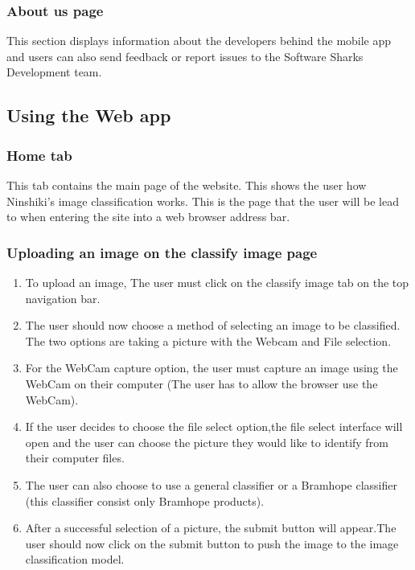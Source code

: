 \documentclass[a4paper, 12pt]{article}
\begin{document}
\subsubsection{About us page}
This section displays information about the developers behind the mobile app and users can also send feedback or report issues to the Software Sharks Development team.

\subsection{Using the Web app}
\subsubsection{Home tab}
This tab contains the main page of the website. This shows the user how Ninshiki's image classification works. This is the page that the user will be lead to when entering the site into a web browser address bar.

\subsubsection{Uploading an image on the classify image page}

\begin{enumerate}
\item To upload an image, The  user must click on the classify image tab on the top navigation bar.
\item The user should now choose a method of selecting an image to be classified. The two options are taking a picture with the Webcam and File selection.
\item For the WebCam capture option, the user must capture an image using the WebCam on their computer (The user has to allow the browser use the WebCam).

\item If the user decides to choose the file select option,the file select interface will open and the user can choose the picture they would like to identify from their computer files. 

\item The user can also choose to use a general classifier or a Bramhope classifier (this classifier consist only Bramhope products). 

\item After a successful selection of a picture, the submit button will appear.The user should now click on the submit button to push the image to the image classification model.

\end{enumerate}
\end{document}
